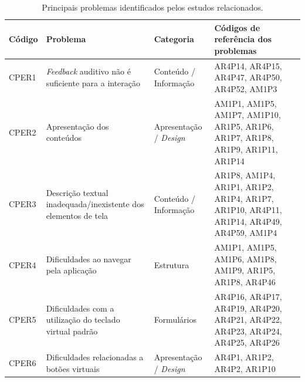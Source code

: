 \begin{table}[htb]
    \begin{center}
        \ABNTEXfontereduzida
        \caption{Principais problemas identificados pelos estudos relacionados.}
        \label{tab-pro-est-rel-1}
        \begin{tabular}{p{1.1cm}|p{4.0cm}|p{2.4cm}|p{6.7cm}}
            \textbf{Código} & \textbf{Problema}                                              & \textbf{Categoria}           & \textbf{Códigos de referência dos problemas}                                                                                                           \\
            \hline
            CPER1           & \emph{Feedback} auditivo não é suficiente para a interação     & Conteúdo / Informação        & AR4P14, AR4P15, AR4P47, AR4P50, AR4P52, AM1P3                                                                                                          \\
            \hline
            CPER2           & Apresentação dos conteúdos                                     & Apresentação / \emph{Design} & AM1P1, AM1P5, AM1P7, AM1P10, AR1P5, AR1P6, AR1P7, AR1P8, AR1P9, AR1P11, AR1P14                                                                         \\
            \hline
            CPER3           & Descrição textual inadequada/inexistente dos elementos de tela & Conteúdo / Informação        & AR1P8, AM1P4, AR1P1, AR1P2, AR1P4, AR1P7, AR1P10, AR4P11, AR1P14, AR4P49, AR4P59, AM1P4                                                                \\
            \hline
            CPER4           & Dificuldades ao navegar pela aplicação                         & Estrutura                    & AM1P1, AM1P5, AM1P6, AM1P8, AM1P9, AR1P5, AR1P8, AR4P46                                                                                                \\
            \hline
            CPER5           & Dificuldades com a utilização do teclado virtual padrão        & Formulários                  & AR4P16, AR4P17, AR4P19, AR4P20, AR4P21, AR4P22, AR4P23, AR4P24, AR4P25, AR4P26                                                                         \\
            \hline
            CPER6           & Dificuldades relacionadas a botões virtuais                    & Apresentação / \emph{Design} & AR4P1, AR1P2, AR4P2, AR1P10                                                                                                                            \\

\end{tabular}
\end{center}
\end{table}

